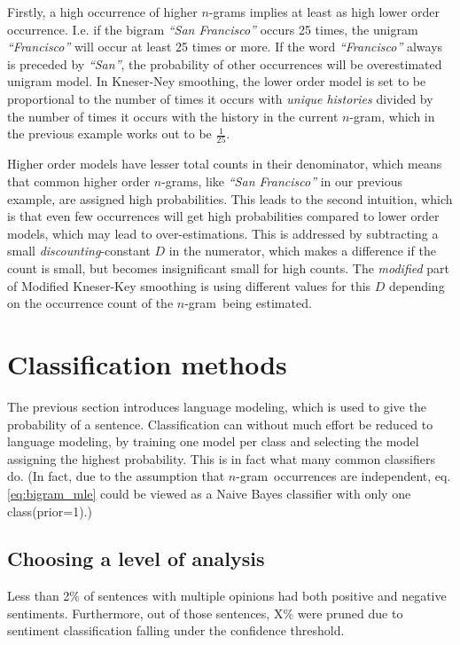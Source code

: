 \documentclass[a4paper,11pt]{kth-mag}
\newcommand{\ngram}{$n$-gram}
\begin{document}
Firstly, a high occurrence of higher \ngram s implies at least as high
lower order occurrence. I.e. if the bigram \emph{``San Francisco''} occurs 25 times,
the unigram \emph{``Francisco''} will occur at least 25 times or more.
If the word \emph{``Francisco''} always is preceded by  \emph{``San''},
the probability of other occurrences will be overestimated unigram model.
In Kneser-Ney smoothing, the lower order model is set to be proportional to the
number of times it occurs with \emph{unique histories} divided by the number of times it
occurs with the history in the current \ngram\cite{chen_goodman}, which  in the previous example
works out to be $\frac{1}{25}$.

Higher order models have lesser total counts in their denominator, which means that common
higher order \ngram s, like \emph{``San Francisco''} in our previous example, are assigned high probabilities.
This leads to the second intuition, which is that even few occurrences will
get high probabilities compared to lower order models, which may lead to over-estimations.
This is addressed by subtracting a small \emph{discounting}-constant $D$ in the numerator,
which makes a difference if the count is small, but becomes insignificant small for high counts.
The \emph{modified} part of Modified Kneser-Key smoothing is using different values for this
$D$ depending on the occurrence count of the \ngram~being estimated\cite{chen_goodman}.


\section{Classification methods}
The previous section introduces language modeling, which is used to give the probability of a sentence.
Classification can without much effort be reduced to language modeling, by training one model per class and
selecting the model assigning the highest probability. This is in fact what many common classifiers do.
(In fact, due to the assumption that \ngram~occurrences are independent, eq. \ref {eq:bigram_mle}
could be viewed as a Naive Bayes classifier with only one class(prior=1).)

\subsection{Choosing a level of analysis}
\label{subsec:sentence_contradictions}
Less than 2\% of sentences with multiple opinions had both positive and negative sentiments.
Furthermore, out of those sentences, X\% were pruned due to sentiment classification falling under the
confidence threshold.
\end{document}

